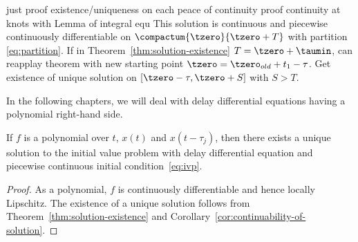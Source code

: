     \begin{corollary}\label{cor:continuability-of-solution}
        just proof existence/uniqueness on each peace of continuity proof continuity at knots with Lemma of integral equ
        This solution is continuous and piecewise continuously differentiable on $\compactum{\tzero}{\tzero+T}$ with partition \eqref{eq:partition}.
        If in Theorem~\ref{thm:solution-existence} $T=\tzero+\taumin$, can reapplay theorem with new starting point $\tzero=\tzero_{old}+t_1-\tau$. Get existence of unique solution on $[\tzero-\tau,\tzero+S]$ with $S>T$.
    \end{corollary}


    In the following chapters, we will deal with delay differential equations having a polynomial right-hand side.
    \begin{corollary}
        If $f$ is a polynomial over $t$, $x(t)$ and $x(t-\tau_j)$, then there exists a unique solution to the initial value problem with delay differential equation and piecewise continuous initial condition~\eqref{eq:ivp}.
    \end{corollary}
    \begin{proof}
        As a polynomial, $f$ is continuously differentiable and hence locally Lipschitz. The existence of a unique solution follows from Theorem~\ref{thm:solution-existence} and Corollary~\ref{cor:continuability-of-solution}.
    \end{proof}

